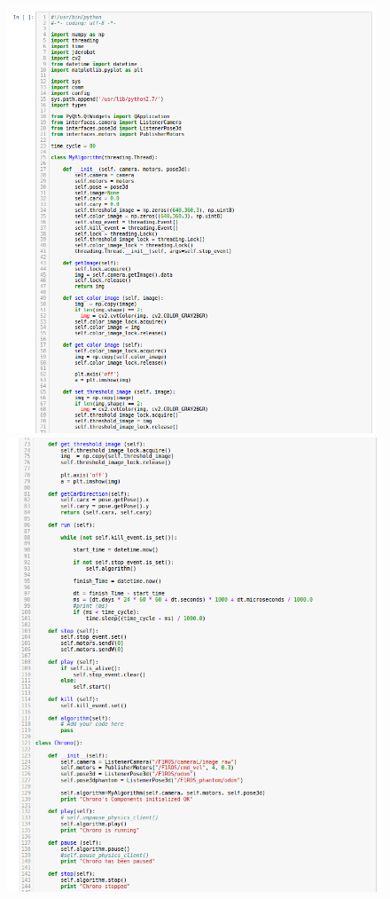 \begin{figure}[H]
    \centering
	\begin{minipage}[h]{.48\linewidth}
    \centering
    \includegraphics[width=0.98\textwidth]{figures/celda_nodo_chrono1.png}
	 \end{minipage}
    \begin{minipage}[h]{.48\linewidth}
    \centering
    \includegraphics[width=0.98\linewidth]{figures/celda_nodo_chrono2.png}

\end{minipage}
\end{figure}
